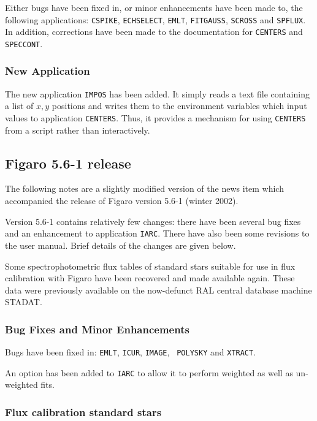  Either bugs have been fixed in, or minor enhancements have been made to,
 the following applications: {\tt CSPIKE}, {\tt ECHSELECT}, {\tt EMLT},
 {\tt FITGAUSS}, {\tt SCROSS} and {\tt SPFLUX}.  In addition, corrections
 have been made to the documentation for {\tt CENTERS} and {\tt SPECCONT}.

\subsubsection{New Application}

 The new application {\tt IMPOS} has been added.  It simply reads a text
 file containing a list of $x,y$\/ positions and writes them to the
 environment variables which input values to application {\tt CENTERS}.
 Thus, it provides a mechanism for using {\tt CENTERS} from a script rather
 than interactively.

\subsection{\label{news561}Figaro 5.6-1 release}

 The following notes are a slightly modified version of the news item
 which accompanied the release of Figaro version 5.6-1 (winter 2002).

 Version 5.6-1 contains relatively few changes: there have been several
 bug fixes and an enhancement to application {\tt IARC}.  There have also
 been some revisions to the user manual.  Brief details of the changes are
 given below.

 Some spectrophotometric flux tables of standard stars suitable for use
 in flux calibration with Figaro have been recovered and made available
 again.  These data were previously available on the now-defunct RAL
 central database machine STADAT.

\subsubsection{Bug Fixes and Minor Enhancements}

 Bugs have been fixed in: {\tt EMLT}, {\tt ICUR}, {\tt IMAGE}, {\tt
 POLYSKY} and {\tt XTRACT}.

 An option has been added to {\tt IARC} to allow it to perform weighted as
 well as un-weighted fits.

\subsubsection{Flux calibration standard stars}

